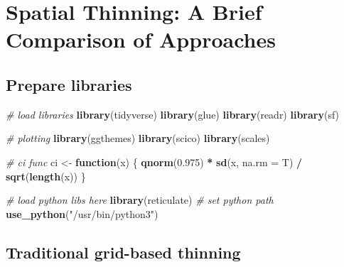 \documentclass[]{article}
\newenvironment{Shaded}{\begin{snugshade}}{\end{snugshade}}
\newcommand{\CommentTok}[1]{\textcolor[rgb]{0.56,0.35,0.01}{\textit{#1}}}
\newcommand{\ControlFlowTok}[1]{\textcolor[rgb]{0.13,0.29,0.53}{\textbf{#1}}}
\newcommand{\DataTypeTok}[1]{\textcolor[rgb]{0.13,0.29,0.53}{#1}}
\newcommand{\FloatTok}[1]{\textcolor[rgb]{0.00,0.00,0.81}{#1}}
\newcommand{\KeywordTok}[1]{\textcolor[rgb]{0.13,0.29,0.53}{\textbf{#1}}}
\newcommand{\NormalTok}[1]{#1}
\newcommand{\OperatorTok}[1]{\textcolor[rgb]{0.81,0.36,0.00}{\textbf{#1}}}
\newcommand{\StringTok}[1]{\textcolor[rgb]{0.31,0.60,0.02}{#1}}
\begin{document}
\hypertarget{spatial-thinning-a-brief-comparison-of-approaches}{%
\section{Spatial Thinning: A Brief Comparison of Approaches}\label{spatial-thinning-a-brief-comparison-of-approaches}}

\hypertarget{prepare-libraries-3}{%
\subsection{Prepare libraries}\label{prepare-libraries-3}}

\begin{Shaded}
\begin{Highlighting}[numbers=left,,]
\CommentTok{# load libraries}
\KeywordTok{library}\NormalTok{(tidyverse)}
\KeywordTok{library}\NormalTok{(glue)}
\KeywordTok{library}\NormalTok{(readr)}
\KeywordTok{library}\NormalTok{(sf)}

\CommentTok{# plotting}
\KeywordTok{library}\NormalTok{(ggthemes)}
\KeywordTok{library}\NormalTok{(scico)}
\KeywordTok{library}\NormalTok{(scales)}

\CommentTok{# ci func}
\NormalTok{ci <-}\StringTok{ }\ControlFlowTok{function}\NormalTok{(x) \{}
  \KeywordTok{qnorm}\NormalTok{(}\FloatTok{0.975}\NormalTok{) }\OperatorTok{*}\StringTok{ }\KeywordTok{sd}\NormalTok{(x, }\DataTypeTok{na.rm =}\NormalTok{ T) }\OperatorTok{/}\StringTok{ }\KeywordTok{sqrt}\NormalTok{(}\KeywordTok{length}\NormalTok{(x))}
\NormalTok{\}}

\CommentTok{# load python libs here}
\KeywordTok{library}\NormalTok{(reticulate)}
\CommentTok{# set python path}
\KeywordTok{use_python}\NormalTok{(}\StringTok{"/usr/bin/python3"}\NormalTok{)}
\end{Highlighting}
\end{Shaded}

\hypertarget{traditional-grid-based-thinning}{%
\subsection{Traditional grid-based thinning}\label{traditional-grid-based-thinning}}
\end{document}
